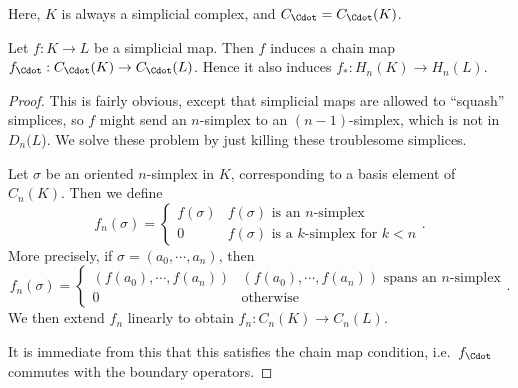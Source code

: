 \documentclass[a4paper]{article}
\begin{document}
Here, $K$ is always a simplicial complex, and $C_{\Cdot} = C_{\Cdot}(K)$.
\begin{lemma}
  Let $f: K \to L$ be a simplicial map. Then $f$ induces a chain map $f_{\Cdot}: C_{\Cdot}(K) \to C_{\Cdot}(L)$. Hence it also induces $f_*: H_n (K) \to H_n(L)$.
\end{lemma}

\begin{proof}
  This is fairly obvious, except that simplicial maps are allowed to ``squash'' simplices, so $f$ might send an $n$-simplex to an $(n - 1)$-simplex, which is not in $D_n(L$). We solve these problem by just killing these troublesome simplices.

  Let $\sigma$ be an oriented $n$-simplex in $K$, corresponding to a basis element of $C_n(K)$. Then we define
  \[
    f_n(\sigma) =
    \begin{cases}
      f(\sigma) & f(\sigma)\text{ is an $n$-simplex}\\
      0 & f(\sigma)\text{ is a $k$-simplex for }k < n
    \end{cases}.
  \]
  More precisely, if $\sigma = (a_0, \cdots, a_n)$, then
  \[
    f_n(\sigma) =
    \begin{cases}
      (f(a_0), \cdots, f(a_n)) & (f(a_0), \cdots, f(a_n))\text{ spans an $n$-simplex}\\
      0 & \text{otherwise}
    \end{cases}.
  \]
  We then extend $f_n$ linearly to obtain $f_n: C_n(K) \to C_n(L)$.

  It is immediate from this that this satisfies the chain map condition, i.e.\ $f_{\Cdot}$ commutes with the boundary operators.
\end{proof}
\end{document}
